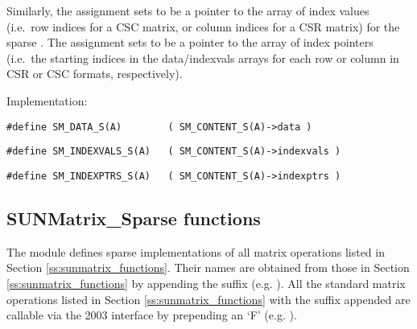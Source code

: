 \begin{itemize}
  Similarly, the assignment 
  sets  to be a pointer to the array of index values
  (i.e.~row indices for a CSC matrix, or column indices for a CSR
  matrix) for the sparse  .  The
  assignment 
  sets  to be a pointer to the array of index
  pointers (i.e.~the starting indices in the data/indexvals arrays for
  each row or column in CSR or CSC formats, respectively).
  
  Implementation:

  \verb|#define SM_DATA_S(A)        ( SM_CONTENT_S(A)->data )|

  \verb|#define SM_INDEXVALS_S(A)   ( SM_CONTENT_S(A)->indexvals )|

  \verb|#define SM_INDEXPTRS_S(A)   ( SM_CONTENT_S(A)->indexptrs )|

\end{itemize}


\subsection{SUNMatrix\_Sparse functions}
\label{ss:sunmat_sparse_functions}

The {\sunmatsparse} module defines sparse implementations of all matrix
operations listed in Section \ref{ss:sunmatrix_functions}. Their names are obtained
from those in Section \ref{ss:sunmatrix_functions} by appending the
suffix  (e.g. ). 
All the standard matrix operations listed in Section \ref{ss:sunmatrix_functions} with the suffix
 appended are callable via the {\F} 2003 interface by prepending an
`F' (e.g. ).

